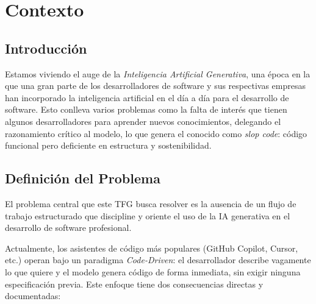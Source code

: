 \documentclass[11pt, letterpaper]{article}
\begin{document}
\tableofcontents
\newpage

\section{Contexto}

\subsection{Introducción}
Estamos viviendo el auge de la \textit{Inteligencia Artificial Generativa}, una época en la que una gran parte de los desarrolladores de software y sus respectivas empresas han incorporado la inteligencia artificial en el día a día para el desarrollo de software. Esto conlleva varios problemas como la falta de interés que tienen algunos desarrolladores para aprender nuevos conocimientos, delegando el razonamiento crítico al modelo, lo que genera el conocido como \textit{slop code}: código funcional pero deficiente en estructura y sostenibilidad.

\subsection{Definición del Problema}

El problema central que este TFG busca resolver es la ausencia de un flujo de trabajo estructurado que discipline y oriente el uso de la IA generativa en el desarrollo de software profesional.

Actualmente, los asistentes de código más populares (GitHub Copilot, Cursor, etc.) operan bajo un paradigma \textit{Code-Driven}: el desarrollador describe vagamente lo que quiere y el modelo genera código de forma inmediata, sin exigir ninguna especificación previa. Este enfoque tiene dos consecuencias directas y documentadas:
\end{document}
